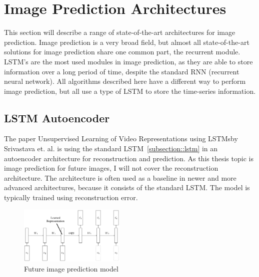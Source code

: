 \section{Image Prediction Architectures} \label{section::related}
 This section will describe a range of state-of-the-art architectures for image prediction. Image prediction is a very broad field, but almost all state-of-the-art solutions
 for image prediction share one common part, the recurrent module. LSTM's are the most used modules in image prediction, as they are able to store information over a long period of time, despite
 the standard RNN (recurrent neural network). All algorithms described here have a different way to perform image prediction, but all use a type of LSTM to store the time-series information.
 
 \subsection{LSTM Autoencoder} \label{subsection::lstm_autoencoder}
  The paper \glqq Unsupervised Learning of Video Representations using LSTMs\grqq by Srivastava et. al. \cite{Srivastava2015} is using the standard LSTM~\ref{subsection::lstm} in an autoencoder 
  architecture for reconstruction and prediction.
  As this thesis topic is image prediction for future images, I will not cover the reconstruction architecture. The architecture is often used as a baseline in newer and more advanced architectures, 
  because it consists of the standard LSTM. The model is typically trained using reconstruction error.
  \begin{figure}[H]
   \includegraphics[width=0.45\textwidth]{../Images/srivastava.png}
   \centering
   \caption{Future image prediction model \citep{Srivastava2015}}
   \label{fig:lstm_architecture}
  \end{figure}


